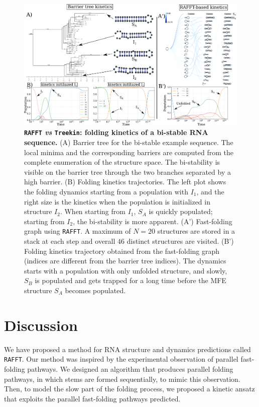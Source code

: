 \begin{figure}[t!]
	\centering
	\includegraphics[width=0.9\linewidth]{../res/images/rafft/kine_bi_sta.png}
	\caption{\label{class_examp}\textbf{\texttt{RAFFT} \emph{vs} \texttt{Treekin}: folding kinetics of a bi-stable RNA sequence.} (A) Barrier tree for the bi-stable example sequence. The local minima and the corresponding barriers are computed from the complete enumeration of the structure space. The bi-stability is visible on the barrier tree through the two branches separated by a high barrier.  (B) Folding kinetics trajectories. The left plot shows the folding dynamics starting from a population with $I_1$, and the right size is the kinetics when the population is initialized in structure $I_2$. When starting from $I_1$, $S_A$ is quickly populated; starting from $I_2$, the bi-stability is more apparent.  (A') Fast-folding graph using \texttt{RAFFT}. A maximum of $N=20$ structures are stored in a stack at each step and overall $46$ distinct structures are visited. (B') Folding kinetics trajectory obtained from the fast-folding graph (indices are different from the barrier tree indices). The dynamics starts with a population with only unfolded structure, and slowly, $S_B$ is populated and gets trapped for a long time before the MFE structure $S_A$ becomes populated.}
\end{figure}

\section*{Discussion}
We have proposed a method for RNA structure and dynamics predictions called \texttt{RAFFT}. Our method was inspired by the experimental observation of parallel fast-folding pathways. We designed an algorithm that produces parallel folding pathways, in which stems are formed sequentially, to mimic this observation. Then, to model the slow part of the folding process, we proposed a kinetic ansatz that exploits the parallel fast-folding pathways predicted.

